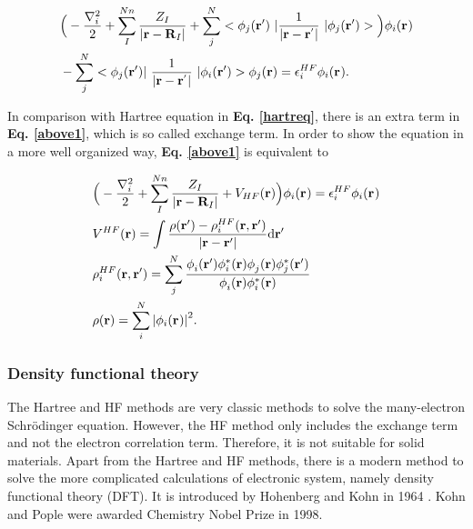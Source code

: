 \documentclass[a4paper, 12pt, titlepage,oneside,drop]{kthesis}
\begin{document}
\begin{equation}\begin{split}\label{above1}
& \Big( -\frac{\nabla^{2}_{i}}{2} + \sum\limits_I^{{Nn}} \frac{Z_{I}}{|\textbf{r}-\textbf{R}_{I}|} + \sum\limits_{j}^{{N}} <\bwfn<j><'>\ | \frac{1}{|\textbf{r} - \textbf{r}^{'} |} \ | \bwfn<j><'>> \Big) \bwff<i><>  \\
& - \sum\limits_{j}^{{N}}  < \bwfn<j><'>|\ \frac{1}{|\textbf{r} - \textbf{r}^{'} |} \ | \bwfn<i><'> > \bwfn<j><>  = \epsilon_{i}^{{HF}} \bwff<i><>.
\end{split}\end{equation}

In comparison with Hartree equation in \textbf{Eq. \ref{hartreq}}, there is an extra term in \textbf{Eq. \ref{above1}}, which is so called exchange term. In order to show the equation in a more well organized way,
\textbf{Eq. \ref{above1}} is equivalent to

\begin{equation}\label{aaaaa}\begin{split}
& \Big( -\frac{\nabla^{2}_{i}}{2} +  \sum\limits_I^{{Nn}} \frac{Z_{I}}{|\textbf{r}-\textbf{R}_{I}|} +V_{HF}(\textbf{r}) \Big)  \bwff<i><>  = \epsilon_{i}^{{HF}}   \bwff<i><> \\
&  V^{HF}(\textbf{r})= \int \frac{\rho(\textbf{r}{'}) - \rho_{{i}}^{{HF}}(\textbf{r},\textbf{r}{'})}{|\textbf{r} - \textbf{r}{'} |}  \mathrm{d}\textbf{r}{'} \\
& \rho_{{i}}^{{HF}}(\textbf{r},\textbf{r}{'}) = \sum\limits_j^N \frac{\phi_{i}^{}(\textbf{r}{'}) \phi_{i}^{*}(\textbf{r}{}) \phi_{j}^{}(\textbf{r}{}) \phi_{j}^{*}(\textbf{r}{'})} {\phi_{i}^{}(\textbf{r}) \phi_{i}^{*}(\textbf{r})}  \\
& \rho(\textbf{r}) = \sum\limits_i^N  {|\bwff<i><>|}^{2}.
\end{split}
\end{equation}


\subsubsection{Density functional theory}
The Hartree and HF methods are very classic methods to solve the many-electron Schrödinger equation. However, the HF method only includes the exchange term and not the electron correlation term. Therefore, it is not suitable 
for solid materials. Apart from the Hartree and HF methods, there is a modern method to solve the more complicated calculations of electronic system, namely density functional theory (DFT). 
It is introduced by Hohenberg and Kohn in 1964 \cite{hohenberg1964inhomogeneous}. Kohn and Pople were awarded Chemistry Nobel Prize in 1998.
\end{document}
